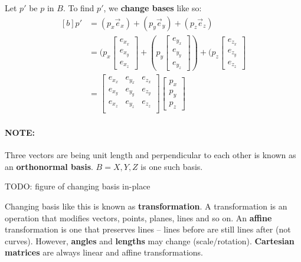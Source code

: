 \documentclass{article}
\begin{document}
Let $p'$ be $p$ in $B$. To find $p'$, we \textbf{change bases} like so:
\begin{equation}
\begin{aligned}[b]
	p' &= (p_x \vec{e}_x) + (p_y \vec{e}_y) + (p_z \vec{e}_z)  \\
	&= (p_x \left[ \begin{matrix} e_{x_x} \\ e_{x_y} \\ e_{x_z} \end{matrix} \right]
	+ (p_y\left[ \begin{matrix} e_{y_x} \\ e_{y_y} \\ e_{y_z} \end{matrix} \right])
	+ (p_z 	\left[ \begin{matrix} e_{z_x} \\ e_{z_y} \\ e_{z_z} \end{matrix} \right]  \\
	&= \left[ \begin{matrix}
		e_{x_x} & e_{y_x} & e_{z_x} \\
		e_{x_y} & e_{y_y} & e_{z_y} \\
		e_{x_z} & e_{y_z} & e_{z_z} \\
	\end{matrix} \right]
	\left[ \begin{matrix} p_x \\ p_y \\ p_z \end{matrix} \right]
\end{aligned}
\end{equation}

\paragraph{\textbf{NOTE: }} Three vectors are being unit length and perpendicular to each other is known as an \textbf{orthonormal basis}. $B = X,Y,Z$ is one such basis.

TODO: figure of changing basis in-place

Changing basis like this is known as \textbf{transformation}. A transformation is an operation that modifies vectors, points, planes, lines and so on. An \textbf{affine} transformation is one that preserves lines -- lines before are still lines after (not curves). However, \textbf{angles} and \textbf{lengths} may change (scale/rotation). \textbf{Cartesian matrices} are always linear and affine transformations.
\end{document}
